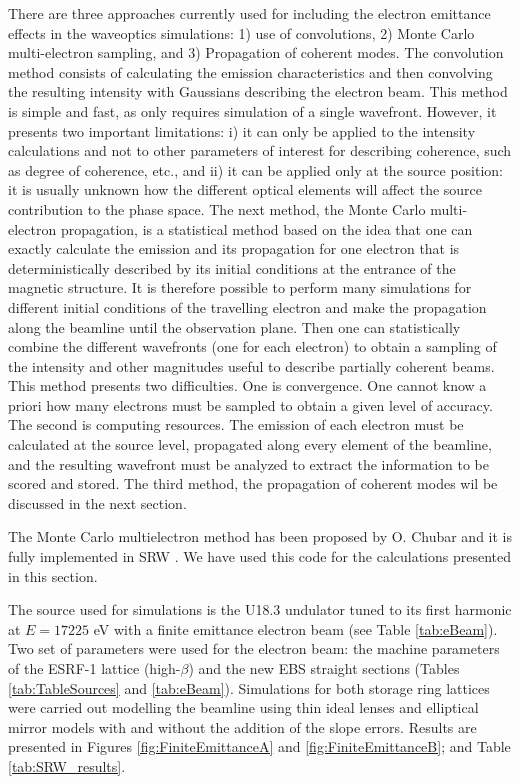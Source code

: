\documentclass{iucr}              %
\begin{document}
There are three approaches currently used for including the electron emittance effects in the waveoptics simulations: 1) use of convolutions, 2) Monte Carlo multi-electron sampling, and 3) Propagation of coherent modes. The convolution method consists of calculating the emission characteristics and then convolving the resulting intensity with Gaussians describing the electron beam. This method is simple and fast, as only requires simulation of a single wavefront. However, it presents two important limitations: i) it can only be applied to the intensity calculations and not to other parameters of interest for describing coherence, such as degree of coherence, etc., and ii) it can be applied only at the source position: it is usually unknown how the different optical elements will affect the source contribution to the phase space. The next method, the Monte Carlo multi-electron propagation,  is a statistical method based on the idea that one can exactly calculate the emission and its propagation for one electron that is deterministically described by its initial conditions at the entrance of the magnetic structure. It is therefore possible to perform many simulations for different initial conditions of the travelling electron and make the propagation along the beamline until the observation plane. Then one can statistically combine the different wavefronts (one for each electron) to obtain a sampling of the intensity and other magnitudes useful to describe partially coherent beams. This method presents two difficulties. One is convergence. One cannot know a priori how many electrons must be sampled to obtain a given level of accuracy. The second is computing resources. The emission of each electron must be calculated at the source level, propagated along every element of the beamline, and the resulting wavefront must be analyzed to extract the information to be scored and stored. The third method, the propagation of coherent modes wil be discussed in the next section. 

The Monte Carlo multielectron method has been proposed by O. Chubar and it is fully implemented in SRW \cite{codeSRW}. We have used this code for the calculations presented in this section.  




The source used for simulations is the U18.3 undulator tuned to its first harmonic at $E=17225$ eV with a finite emittance electron beam (see Table \ref{tab:eBeam}). Two set of parameters were used for the electron beam: the machine parameters of the ESRF-1 lattice (high-$\beta$) and the new EBS straight sections (Tables \ref{tab:TableSources} and \ref{tab:eBeam}). Simulations for both storage ring lattices were carried out modelling the beamline using thin ideal lenses and elliptical mirror models with and without the addition of the slope errors. Results are presented in Figures \ref{fig:FiniteEmittanceA} and \ref{fig:FiniteEmittanceB}; and Table \ref{tab:SRW_results}.
\end{document}
